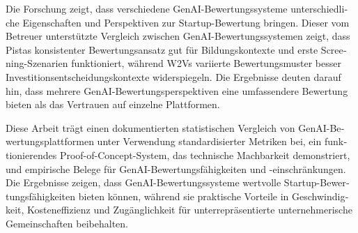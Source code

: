 \begin{otherlanguage}{ngerman}
Die Forschung zeigt, dass verschiedene GenAI-Bewertungssysteme unterschiedliche Eigenschaften und Perspektiven zur Startup-Bewertung bringen. Dieser vom Betreuer unterstützte Vergleich zwischen GenAI-Bewertungssystemen zeigt, dass Pistas konsistenter Bewertungsansatz gut für Bildungskontexte und erste Screening-Szenarien funktioniert, während W2Vs variierte Bewertungsmuster besser Investitionsentscheidungskontexte widerspiegeln. Die Ergebnisse deuten darauf hin, dass mehrere GenAI-Bewertungsperspektiven eine umfassendere Bewertung bieten als das Vertrauen auf einzelne Plattformen.

Diese Arbeit trägt einen dokumentierten statistischen Vergleich von GenAI-Bewertungsplattformen unter Verwendung standardisierter Metriken bei, ein funktionierendes Proof-of-Concept-System, das technische Machbarkeit demonstriert, und empirische Belege für GenAI-Bewertungsfähigkeiten und -einschränkungen. Die Ergebnisse zeigen, dass GenAI-Bewertungssysteme wertvolle Startup-Bewertungsfähigkeiten bieten können, während sie praktische Vorteile in Geschwindigkeit, Kosteneffizienz und Zugänglichkeit für unterrepräsentierte unternehmerische Gemeinschaften beibehalten.

\end{otherlanguage}